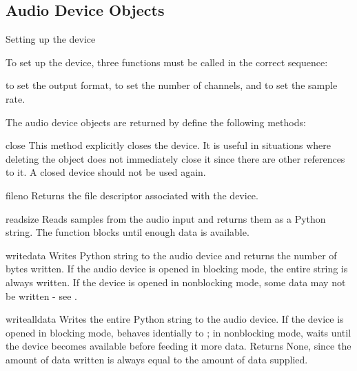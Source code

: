 \subsection{Audio Device Objects \label{ossaudio-device-objects}}

Setting up the device

To set up the device, three functions must be called in the correct sequence:

 to set the output format,
 to set the number of channels, and
 to set the sample rate.

The audio device objects are returned by  define the
following methods:

\begin{methoddesc}{close}{}
This method explicitly closes the device. It is useful in situations
where deleting the object does not immediately close it since there
are other references to it. A closed device should not be used again.
\end{methoddesc}

\begin{methoddesc}{fileno}{}
Returns the file descriptor associated with the device. 
\end{methoddesc}

\begin{methoddesc}{read}{size}
Reads  samples from the audio input and returns
them as a Python string. The function blocks until enough data is available.
\end{methoddesc}

\begin{methoddesc}{write}{data}
Writes Python string  to the audio device and returns the number of
bytes written. If the audio device is opened in blocking mode, the entire
string is always written. If the device is opened in nonblocking mode, some data
may not be written - see .
\end{methoddesc}

\begin{methoddesc}{writeall}{data}
Writes the entire Python string  to the audio device. If the device
is opened in blocking mode, behaves identially to ; in nonblocking
mode, waits until the device becomes available before feeding it more data.
Returns None, since the amount of data written is always equal to the amount
of data supplied.
\end{methoddesc}

